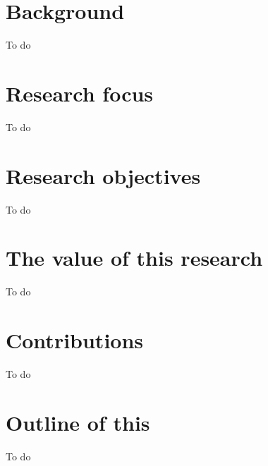 \section{Background}
To do








\section{Research focus}
To do





\section{Research objectives}
To do




\section{The value of this research}
To do




\section{Contributions}
To do



\section{Outline of this \Dissertation}
To do




